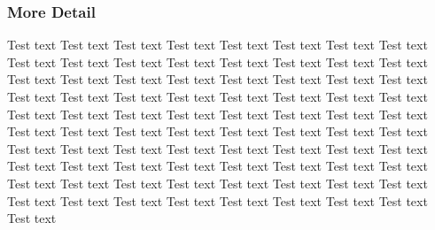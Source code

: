 \subsubsection{More Detail}
	Test text Test text Test text Test text Test text Test text Test text Test text Test text Test text Test text Test text Test text Test text Test text Test text Test text Test text Test text Test text Test text Test text Test text Test text Test text Test text Test text Test text Test text Test text Test text Test text Test text Test text Test text Test text Test text Test text Test text Test text Test text Test text Test text Test text Test text Test text Test text Test text Test text Test text Test text Test text Test text Test text Test text Test text Test text Test text Test text Test text Test text Test text Test text Test text Test text Test text Test text Test text Test text Test text Test text Test text Test text Test text Test text Test text Test text Test text Test text Test text Test text 